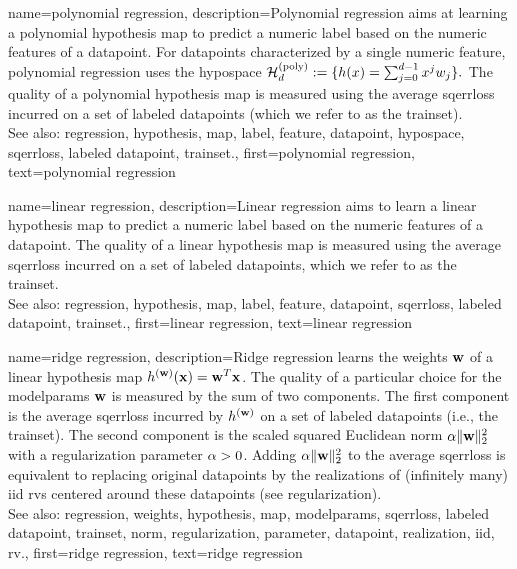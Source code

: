 {name={polynomial regression}, 
	description={Polynomial 
		\gls{regression} aims at learning a polynomial \gls{hypothesis} \gls{map} to predict a numeric \gls{label} based
		 on the numeric \glspl{feature} of a \gls{datapoint}. For \glspl{datapoint} characterized by a single 
		 numeric \gls{feature}, polynomial \gls{regression} uses the \gls{hypospace} 
			$\mathcal{H}^{(\rm poly)}_{d} := \{ h(x) = \sum_{j=0}^{d-1} x^{j} w_{j} \}.$
			The quality of a polynomial \gls{hypothesis} \gls{map} is measured using the average \gls{sqerrloss} 
			incurred on a set of \glspl{labeled datapoint} (which we refer to as the 
			\gls{trainset}).
					\\
		See also: \gls{regression}, \gls{hypothesis}, \gls{map}, \gls{label}, \gls{feature}, \gls{datapoint}, \gls{hypospace}, \gls{sqerrloss}, \gls{labeled datapoint}, \gls{trainset}.},
		first={polynomial regression},
		text={polynomial regression}
}

{name={linear regression}, 
	description={Linear 
		\gls{regression} aims to learn a linear \gls{hypothesis} \gls{map} to predict a numeric \gls{label} based 
		on the numeric \glspl{feature} of a \gls{datapoint}. The quality of a linear \gls{hypothesis} \gls{map} is 
		measured using the average \gls{sqerrloss} incurred on a set of \glspl{labeled datapoint}, 
		which we refer to as the \gls{trainset}.
				\\
		See also: \gls{regression}, \gls{hypothesis}, \gls{map}, \gls{label}, \gls{feature}, \gls{datapoint},  \gls{sqerrloss}, \gls{labeled datapoint}, \gls{trainset}.},
		first={linear regression},
		text={linear regression}
}
        
{name={ridge regression}, 
	description={Ridge 
		\gls{regression} learns the \gls{weights} ${\bf w}$ of a linear \gls{hypothesis} \gls{map} $h^{({\bf w})}({\bf x})= {\bf w}^{T} {\bf x}$. 
		The quality of a particular choice for the \gls{modelparams} ${\bf w}$ is measured by the sum 
		of two components. The first component is the average \gls{sqerrloss} incurred by $h^{({\bf w})}$ on a set of 
		\glspl{labeled datapoint} (i.e., the \gls{trainset}). The second component is the scaled squared 
		Euclidean \gls{norm} $\alpha \| {\bf w} \|^{2}_{2}$ with a \gls{regularization} \gls{parameter} 
		$\alpha > 0$. Adding $\alpha \| {\bf w} \|^{2}_{2}$ to 
	    	the average \gls{sqerrloss} is equivalent to replacing original \glspl{datapoint} by the \glspl{realization} 
	    	of (infinitely many) \gls{iid} \glspl{rv} centered around these \glspl{datapoint} (see \gls{regularization}).
	    		\\
		See also: \gls{regression}, \gls{weights}, \gls{hypothesis}, \gls{map}, \gls{modelparams}, \gls{sqerrloss}, \gls{labeled datapoint}, \gls{trainset}, \gls{norm}, \gls{regularization}, \gls{parameter}, \gls{datapoint}, \gls{realization}, \gls{iid}, \gls{rv}.},
		first={ridge regression},
		text={ridge regression}
}


